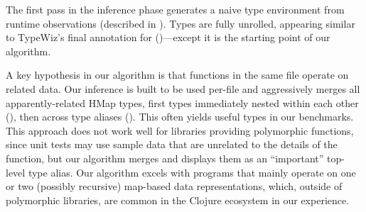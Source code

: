%
%


The first pass in the inference phase generates a naive type environment
from runtime observations (described in ). Types are fully unrolled, appearing
similar to TypeWiz's final annotation for 
()---except it is the starting point of
our algorithm.

A key hypothesis in our algorithm is that functions in the same
file operate on related data. Our inference is built
to be used per-file and aggressively merges all apparently-related HMap types,
first types immediately nested within each other (),
then across type aliases
().
This often yields useful types in our benchmarks.
This approach does not work well for libraries providing polymorphic
functions, since unit tests may use sample data that are unrelated
to the details of the function, but our algorithm merges and displays
them as an ``important'' top-level type alias.
Our algorithm excels
with programs that mainly operate on one or two (possibly recursive) map-based
data representations,
which, outside of polymorphic libraries, are common in the Clojure ecosystem
in our experience.

